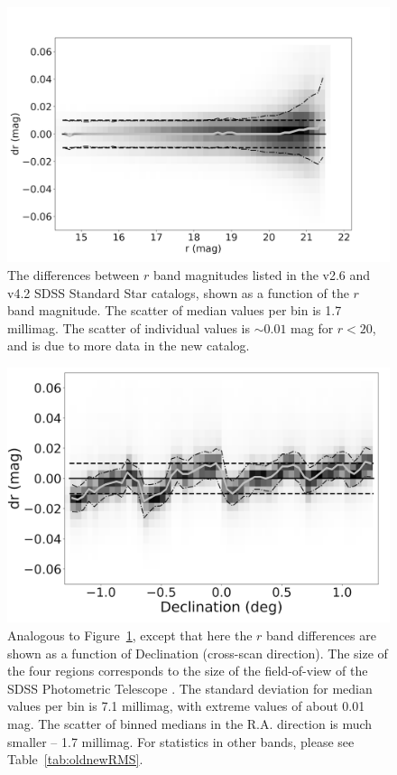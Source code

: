 \documentclass[fleqn,usenatbib]{mnras}
\begin{document}
\begin{figure}
    \centering\includegraphics[width=0.95\columnwidth]{figures/testV26vsV42_r_dr_r_mag_Hess_lr.png} 
\caption{The differences between $r$ band magnitudes listed in the v2.6 and v4.2 
SDSS Standard Star catalogs,  shown as a function of the $r$ band magnitude. The 
scatter of median values per bin is 1.7 millimag. The scatter of individual values is 
$\sim0.01$ mag for $r<20$, and is due to more data in the new catalog.} 
\label{fig:v26v34drr}
\end{figure}


\begin{figure}
    \centering\includegraphics[width=0.95\columnwidth]{figures/testV26vsV42_r_dr_Dec_Hess_lr.png} 
\caption{Analogous to Figure~\ref{fig:v26v34drr}, except that here the $r$ band
differences are shown as a function of Declination (cross-scan direction). The size 
of the four regions corresponds to the size of the field-of-view of the SDSS Photometric Telescope \citep{2006AN....327..821T}. 
The standard deviation for median values per bin is 7.1 millimag, with extreme values of about 
0.01 mag. The scatter of binned medians in the R.A. direction is much smaller -- 1.7 millimag. 
For statistics in other bands, please see Table~\ref{tab:oldnewRMS}.}
\label{fig:v26v34drDec}
\end{figure}
 
\end{document}
